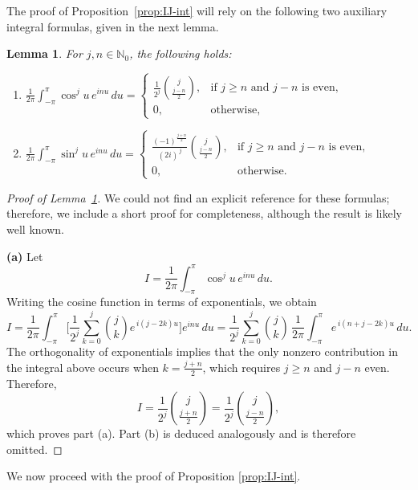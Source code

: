 \documentclass[12pt]{amsart}
\numberwithin{equation}{section}
\newtheorem{lemma}[theorem]{Lemma}
\theoremstyle{boldremark}
\begin{document}
The proof of Proposition~\ref{prop:IJ-int} will rely on the following two auxiliary integral formulas, given in the next lemma.

\begin{lemma}\label{lem:integrali}
For $j,n\in\mathbb{N}_0$, the following holds:
\begin{enumerate}[label=\textup{(\alph*)}]
  \item $\displaystyle \frac{1}{2\pi}\!\int_{-\pi}^{\pi}\cos^{j}u\,e^{inu}\,du
  =
  \begin{cases}
    \displaystyle \frac{1}{2^{j}}\binom{j}{\frac{j-n}{2}}, & \text{if } j\ge n \text{ and } j-n \text{ is even},\\[6pt]
    0, & \text{otherwise},
  \end{cases}$

  \item $\displaystyle \frac{1}{2\pi}\!\int_{-\pi}^{\pi}\sin^{j}u\,e^{inu}\,du
  =
  \begin{cases}
    \displaystyle \frac{(-1)^{\frac{j+n}{2}}}{(2i)^{\,j}}\binom{j}{\frac{j-n}{2}}, & \text{if } j\ge n \text{ and } j-n \text{ is even},\\[6pt]
    0, & \text{otherwise}.
  \end{cases}$
\end{enumerate}
\end{lemma}

\begin{proof}[Proof of Lemma~\ref{lem:integrali}] We could not find an explicit reference for these formulas; therefore, we include a short proof for completeness, although the result is likely well known.

\textbf{(a)} Let
$$
I=\frac{1}{2\pi}\int_{-\pi}^{\pi}\cos^{j}u\,e^{inu}\,du.
$$
Writing the cosine function in terms of exponentials, we obtain
$$
I=\frac{1}{2\pi}\int_{-\pi}^{\pi}\Bigg[\frac{1}{2^{j}}
\sum_{k=0}^{j}\binom{j}{k}e^{\,i(j-2k)u}\Bigg]e^{inu}\,du
=\frac{1}{2^{j}}\sum_{k=0}^{j}\binom{j}{k}\,
\frac{1}{2\pi}\int_{-\pi}^{\pi}e^{\,i(n+j-2k)u}\,du.
$$
The orthogonality of exponentials implies that the only nonzero contribution in the integral above occurs when $k=\frac{j+n}{2}$, which requires
$j\ge n$ and $j-n$ even. Therefore,
\[
I=\frac{1}{2^{j}}\binom{j}{\frac{j+n}{2}}
=\frac{1}{2^{j}}\binom{j}{\frac{j-n}{2}},
\]
which proves part (a). Part (b) is deduced analogously and is therefore omitted.
\end{proof}

We now proceed with the proof of Proposition \ref{prop:IJ-int}.
\end{document}
